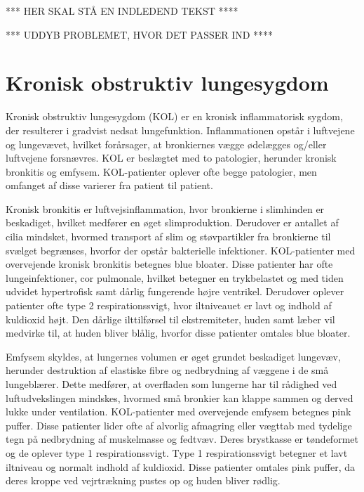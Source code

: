***     HER SKAL STÅ EN INDLEDEND TEKST ****

***     UDDYB PROBLEMET, HVOR DET PASSER IND  	****


\section{Kronisk obstruktiv lungesygdom}
Kronisk obstruktiv lungesygdom (KOL) er en kronisk inflammatorisk sygdom, der resulterer i gradvist nedsat lungefunktion. Inflammationen opstår i luftvejene og lungevævet, hvilket forårsager, at bronkiernes vægge ødelægges og/eller luftvejene forsnævres. KOL er beslægtet med to patologier, herunder kronisk bronkitis og emfysem. KOL-patienter oplever ofte begge patologier, men omfanget af disse varierer fra patient til patient.\cite{Basisbogen2016}

Kronisk bronkitis er luftvejsinflammation, hvor bronkierne i slimhinden er beskadiget, hvilket medfører en øget slimproduktion. Derudover er antallet af cilia mindsket, hvormed transport af slim og støvpartikler fra bronkierne til svælget begrænses, hvorfor der opstår bakterielle infektioner.\cite{Frausing2011,Britannica2016} KOL-patienter med overvejende kronisk bronkitis betegnes blue bloater. Disse patienter har ofte lungeinfektioner, cor pulmonale, hvilket betegner en trykbelastet og med tiden udvidet hypertrofisk samt dårlig fungerende højre ventrikel. Derudover oplever patienter ofte  type 2 respirationssvigt, hvor iltniveauet er lavt og indhold af kuldioxid højt. Den dårlige ilttilførsel til ekstremiteter, huden samt læber vil medvirke til, at huden bliver blålig, hvorfor disse patienter omtales blue bloater.\cite{Healthguidances2016}

Emfysem skyldes, at lungernes volumen er øget grundet beskadiget lungevæv, herunder destruktion af elastiske fibre og nedbrydning af væggene i de små lungeblærer. Dette medfører, at overfladen som lungerne har til rådighed ved luftudvekslingen mindskes, hvormed små bronkier kan klappe sammen og derved lukke under ventilation.\cite{Frausing2011a,Flaschen-Hansen2008} KOL-patienter med overvejende emfysem betegnes pink puffer. Disse patienter lider ofte af alvorlig afmagring eller vægttab med tydelige tegn på nedbrydning af muskelmasse og fedtvæv. Deres brystkasse er tøndeformet og de oplever type 1 respirationssvigt. Type 1 respirationssvigt betegner et lavt iltniveau og normalt indhold af kuldioxid. Disse patienter omtales pink puffer, da deres kroppe ved vejrtrækning pustes op og huden bliver rødlig.\cite{Healthguidances2016}

